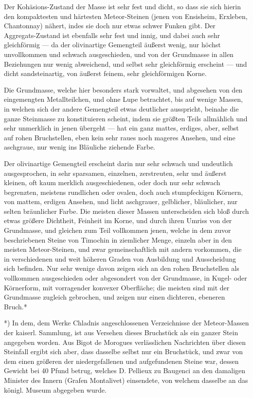 \documentclass[a4paper, 11pt, oneside, german]{article}
\begin{document}
Der Kohäsions-Zustand der Masse ist sehr fest und dicht, so dass sie sich hierin den kompaktesten und härtesten Meteor-Steinen (jenen von Ensisheim, Erxleben, Chantonnay) nähert, indes sie doch nur etwas schwer Funken gibt. Der Aggregats-Zustand ist ebenfalls sehr fest und innig, und dabei auch sehr gleichförmig --- da der olivinartige Gemengteil äußerst wenig, nur höchst unvollkommen und schwach ausgeschieden, und von der Grundmasse in allen Beziehungen nur wenig abweichend, und selbst sehr gleichförmig erscheint --- und dicht sandsteinartig, von äußerst feinem, sehr gleichförmigen Korne.

Die Grundmasse, welche hier besonders stark vorwaltet, und abgesehen von den eingemengten Metallteilchen, und ohne Lupe betrachtet, bis auf wenige Massen, in welchen sich der andere Gemengteil etwas deutlicher ausspricht, beinahe die ganze Steinmasse zu konstituieren scheint, indem sie größten Teils allmählich und sehr unmerklich in jenen übergeht --- hat ein ganz mattes, erdiges, aber, selbst auf rohen Bruchstellen, eben kein sehr raues noch mageres Ansehen, und eine aschgraue, nur wenig ins Bläuliche ziehende Farbe.

Der olivinartige Gemengteil erscheint darin nur sehr schwach und undeutlich ausgesprochen, in sehr sparsamen, einzelnen, zerstreuten, sehr und äußerst kleinen, oft kaum merklich ausgeschiedenen, oder doch nur sehr schwach begrenzten, meistens rundlichen oder ovalen, doch auch stumpfeckigen Körnern, von mattem, erdigen Ansehen, und licht aschgrauer, gelblicher, bläulicher, nur selten bräunlicher Farbe. Die meisten dieser Massen unterscheiden sich bloß durch etwas größere Dichtheit, Feinheit im Korne, und durch ihren Umriss von der Grundmasse, und gleichen zum Teil vollkommen jenen, welche in dem zuvor beschriebenen Steine von Timochin in ziemlicher Menge, einzeln aber in den meisten Meteor-Steinen, und zwar gemeinschaftlich mit andern vorkommen, die in verschiedenen und weit höheren Graden von Ausbildung und Ausscheidung sich befinden. Nur sehr wenige davon zeigen sich an den rohen Bruchstellen als vollkommen ausgeschieden oder abgesondert von der Grundmasse, in Kugel- oder Körnerform, mit vorragender konvexer Oberfläche; die meisten sind mit der Grundmasse zugleich gebrochen, und zeigen nur einen dichteren, ebeneren Bruch.*

*) In dem, dem Werke Chladnis angeschlossenen Verzeichnisse der Meteor-Massen der kaiserl. Sammlung, ist aus Versehen dieses Bruchstück als ein ganzer Stein angegeben worden. Aus Bigot de Morogues verlässlichen Nachrichten über diesen Steinfall ergibt sich aber, dass dasselbe selbst nur ein Bruchstück, und zwar von dem einen größeren der niedergefallenen und aufgefundenen Steine war, dessen Gewicht bei 40 Pfund betrug, welches D. Pellieux zu Baugenci an den damaligen Minister des Innern (Grafen Montalivet) einsendete, von welchem dasselbe an das königl. Museum abgegeben wurde.
\end{document}
